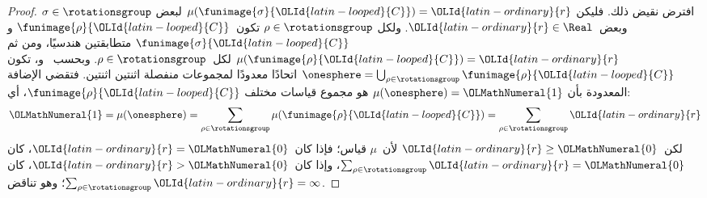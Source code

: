 \documentclass[../../../include/open-logic-section]{subfiles}
\begin{document}
\begin{proof}
افترض نقيض ذلك. فليكن
$\mu(\funimage{\sigma}{\OLId{latin-looped}{C}}) = \OLId{latin-ordinary}{r}$ لبعض
$\sigma \in \rotationsgroup$ وبعض~$\OLId{latin-ordinary}{r} \in \Real$. ولكل
$\rho \in \rotationsgroup$ تكون~$\funimage{\rho}{\OLId{latin-looped}{C}}$ و
$\funimage{\sigma}{\OLId{latin-looped}{C}}$ متطابقتين هندسيًا، ومن ثم
$\mu(\funimage{\rho}{\OLId{latin-looped}{C}}) = \OLId{latin-ordinary}{r}$ لكل~$\rho \in \rotationsgroup$.
وبحسب~ و، تكون
$\onesphere =
\bigcup_{\rho \in \rotationsgroup}\funimage{\rho}{\OLId{latin-looped}{C}}$ اتحادًا
معدودًا لمجموعات منفصلة اثنتين اثنتين. فتقضي الإضافة المعدودة بأن
$\mu(\onesphere) = \OLMathNumeral{1}$ هو مجموع قياسات مختلف
$\funimage{\rho}{\OLId{latin-looped}{C}}$، أي:
\[
	\OLMathNumeral{1} = \mu(\onesphere) = \sum_{\rho \in \rotationsgroup}\mu(\funimage{\rho}{\OLId{latin-looped}{C}}) = \sum_{\rho \in \rotationsgroup}\OLId{latin-ordinary}{r}
\]
لكن~$\OLId{latin-ordinary}{r} \geq \OLMathNumeral{0}$ لأن~$\mu$ قياس؛ فإذا كان~$\OLId{latin-ordinary}{r} = \OLMathNumeral{0}$، كان
$\sum_{\rho \in \rotationsgroup}\OLId{latin-ordinary}{r} = \OLMathNumeral{0}$، وإذا كان~$\OLId{latin-ordinary}{r} > \OLMathNumeral{0}$، كان
$\sum_{\rho \in \rotationsgroup}\OLId{latin-ordinary}{r} = \infty$؛ وهو تناقض.
\end{proof}
\end{document}

